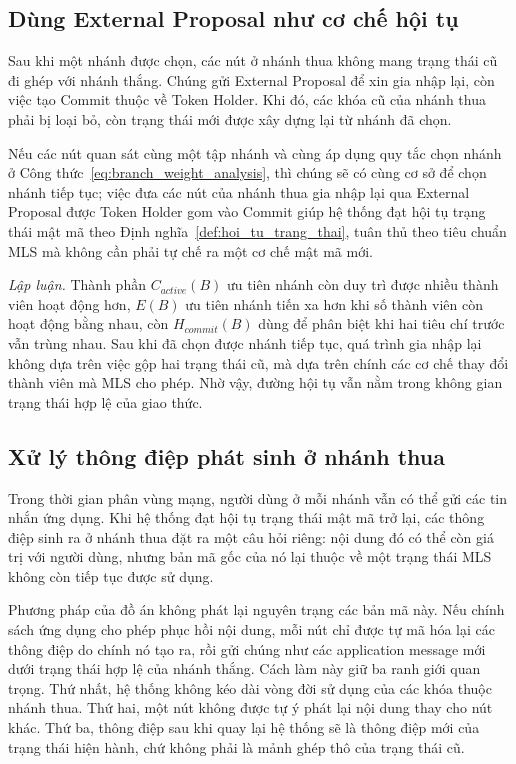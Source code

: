 \documentclass[../DoAn.tex]{subfiles}
\begin{document}
\subsection{Dùng External Proposal như cơ chế hội tụ}

Sau khi một nhánh được chọn, các nút ở nhánh thua không mang trạng thái cũ đi ghép với nhánh thắng. Chúng gửi External Proposal để xin gia nhập lại, còn việc tạo Commit thuộc về Token Holder. Khi đó, các khóa cũ của nhánh thua phải bị loại bỏ, còn trạng thái mới được xây dựng lại từ nhánh đã chọn.

\begin{proposition}
\label{prop:no_merge_branches}
Nếu các nút quan sát cùng một tập nhánh và cùng áp dụng quy tắc chọn nhánh ở Công thức~\eqref{eq:branch_weight_analysis}, thì chúng sẽ có cùng cơ sở để chọn nhánh tiếp tục; việc đưa các nút của nhánh thua gia nhập lại qua External Proposal được Token Holder gom vào Commit giúp hệ thống đạt hội tụ trạng thái mật mã theo Định nghĩa~\ref{def:hoi_tu_trang_thai}, tuân thủ theo tiêu chuẩn MLS mà không cần phải tự chế ra một cơ chế mật mã mới.
\end{proposition}

\textit{Lập luận.} Thành phần $C_{active}(B)$ ưu tiên nhánh còn duy trì được nhiều thành viên hoạt động hơn, $E(B)$ ưu tiên nhánh tiến xa hơn khi số thành viên còn hoạt động bằng nhau, còn $H_{commit}(B)$ dùng để phân biệt khi hai tiêu chí trước vẫn trùng nhau. Sau khi đã chọn được nhánh tiếp tục, quá trình gia nhập lại không dựa trên việc gộp hai trạng thái cũ, mà dựa trên chính các cơ chế thay đổi thành viên mà MLS cho phép. Nhờ vậy, đường hội tụ vẫn nằm trong không gian trạng thái hợp lệ của giao thức.

\subsection{Xử lý thông điệp phát sinh ở nhánh thua}
\label{sec:xu_ly_thong_diep_nhanh_thua}

Trong thời gian phân vùng mạng, người dùng ở mỗi nhánh vẫn có thể gửi các tin nhắn ứng dụng. Khi hệ thống đạt hội tụ trạng thái mật mã trở lại, các thông điệp sinh ra ở nhánh thua đặt ra một câu hỏi riêng: nội dung đó có thể còn giá trị với người dùng, nhưng bản mã gốc của nó lại thuộc về một trạng thái MLS không còn tiếp tục được sử dụng.

Phương pháp của đồ án không phát lại nguyên trạng các bản mã này. Nếu chính sách ứng dụng cho phép phục hồi nội dung, mỗi nút chỉ được tự mã hóa lại các thông điệp do chính nó tạo ra, rồi gửi chúng như các application message mới dưới trạng thái hợp lệ của nhánh thắng. Cách làm này giữ ba ranh giới quan trọng. Thứ nhất, hệ thống không kéo dài vòng đời sử dụng của các khóa thuộc nhánh thua. Thứ hai, một nút không được tự ý phát lại nội dung thay cho nút khác. Thứ ba, thông điệp sau khi quay lại hệ thống sẽ là thông điệp mới của trạng thái hiện hành, chứ không phải là mảnh ghép thô của trạng thái cũ.
\end{document}
